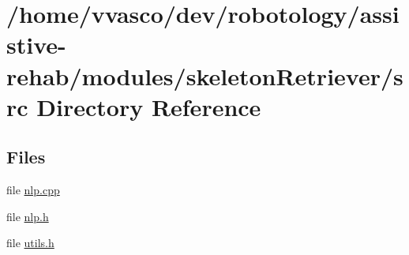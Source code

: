 \section{/home/vvasco/dev/robotology/assistive-\/rehab/modules/skeleton\+Retriever/src Directory Reference}
\label{dir_297a1fbeae630d5d632032e7eb29a5e6}
\subsection*{Files}
\begin{DoxyCompactItemize}
\item 
file \hyperlink{nlp_8cpp}{nlp.\+cpp}
\item 
file \hyperlink{nlp_8h}{nlp.\+h}
\item 
file \hyperlink{utils_8h}{utils.\+h}
\end{DoxyCompactItemize}
